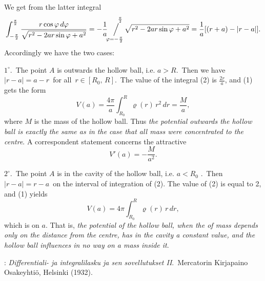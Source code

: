 \documentclass[12pt]{article}
\newcommand{\sijoitus}[2]%
{\operatornamewithlimits{\Big/}_{\!\!\!#1}^{\,#2}}
\begin{document}
We get from the latter integral
\begin{align}
\int_{-\frac{\pi}{2}}^\frac{\pi}{2}
\frac{r\cos\varphi\,d\varphi}{\sqrt{r^2-2ar\sin\varphi+a^2}}
= -\frac{1}{a}\sijoitus{\varphi=-\frac{\pi}{2}}{\quad\frac{\pi}{2}}\sqrt{r^2-2ar\sin\varphi+a^2}
= \frac{1}{a}[(r+a)-|r-a|].
\end{align}
Accordingly we have the two cases:

$1^\circ$.\, The point $A$ is outwards the hollow ball, i.e. $a > R$.\, Then we have\, $|r-a| = a-r$\, for all\, 
$r\in[R_0,\,R]$.\, The value of the integral (2) is $\frac{2r}{a}$, and (1) gets the form
$$V(a) = \frac{4\pi}{a}\int_{R_0}^R \varrho(r)\,r^2\,dr = \frac{M}{a},$$
where $M$ is the mass of the hollow ball.  Thus {\em the potential outwards the hollow ball is exactly the same as in the case that all mass were concentrated to the centre}.  A correspondent statement concerns the attractive 
                 $$V'(a) = -\frac{M}{a^2}.$$


$2^\circ$.\, The point $A$ is in the cavity of the hollow ball, i.e. $a < R_0$ .\, Then\, $|r-a| = r-a$\, on the interval of integration of (2).  The value of (2) is equal to 2, and (1) yields
           $$V(a) = 4\pi\int_{R_0}^R \varrho(r)\,r\,dr,$$
which is  on $a$.  That is, {\em the potential of the hollow ball, when the  of mass depends only on the distance from the centre, has in the cavity a constant value, and the hollow ball influences in no way on a mass inside it}.

\begin{thebibliography}{8}
: {\em Differentiali- ja integralilasku
ja sen sovellutukset II}.\, Mercatorin Kirjapaino Osakeyhti\"o, Helsinki (1932).
\end{thebibliography} 


\end{document}
